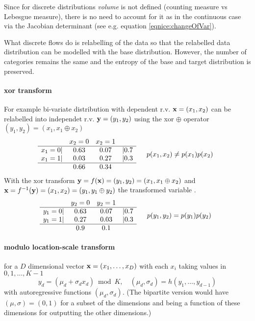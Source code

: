 Since for discrete distributions \emph{volume} is not defined (counting measure vs Lebesgue measure), there is no need to account for it as in the continuous case via the Jacobian determinant (see e.g. equation \eqref{eqnice:changeOfVar}).

What discrete flows do is relabelling of the data so that the relabelled data distribution can be modelled with the base distribution. However, the number of categories remains the same and the entropy of the base and target distribution is preserved.

\paragraph{xor transform}
For example bi-variate distribution with dependent r.v. $\mathbf{x} = (x_1, x_2)$ can be relabelled into independet r.v. $\mathbf{y} = (y_1, y_2)$ using the xor $\oplus$ operator $(y_1, y_2) = (x_1, x_1 \oplus x_2)$
\begin{equation*}
\begin{matrix}
  & x_2 = 0 & x_2 = 1 & \\
\hline
x_1 = 0 | & 0.63 & 0.07 & | 0.7\\
x_1 = 1 | & 0.03 & 0.27 & | 0.3\\
\hline
  & 0.66 & 0.34 &  \\
\end{matrix}
\qquad p(x_1, x_2) \neq p(x_1) p(x_2)
\end{equation*}
With the xor transform $\mathbf{y} = f(\mathbf{x}) = (y_1, y_2) = (x_1, x_1 \oplus x_2)$ and $\mathbf{x} = f^{-1}(\mathbf{y}) = (x_1, x_2) = (y_1, y_1 \oplus y_2)$ the transformed variable .
\begin{equation*}
\begin{matrix}
  & y_2 = 0 & y_2 = 1 & \\
\hline
y_1 = 0 | & 0.63 & 0.07 & | 0.7\\
y_1 = 1 | & 0.27 & 0.03 & | 0.3\\
\hline
  & 0.9 & 0.1 &  \\
\end{matrix}
\qquad p(y_1, y_2) = p(y_1) p(y_2)
\end{equation*}

\paragraph{modulo location-scale transform} for a $D$ dimensional vector $\mathbf{x} = (x_1, \dots, x_D)$ with each $x_i$ taking values in $0, 1, \ldots, K-1$
\begin{equation}
y_d = (\mu_d + \sigma_d x_d)\bmod K, \quad (\mu_d, \sigma_d) = h(y_1, \ldots, y_{d-1})
\end{equation}
with autoregressive functions $(\mu_d, \sigma_d)$.
(The bipartite version would have $(\mu, \sigma) = (0,1)$ for a subset of the dimensions and being a function of these dimensions for outputting the other dimensions.)


